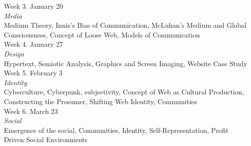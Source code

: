 \documentclass[10pt]{article}
\begin{document}
Week 3. January 20 \\
\textit{Media} \\
Medium Theory, Innis’s Bias of Communication, McLuhan’s Medium and Global Consciousness, Concept of Loose Web, Models of Communication \\

Week 4. January 27 \\
\textit{Design} \\
Hypertext, Semiotic Analysis, Graphics and Screen Imaging, Website Case Study \\

Week 5. February 3 \\
\textit{Identity} \\
Cyberculture, Cyberpunk,  subjectivity, Concept of Web as Cultural Production, Constructing the Prosumer, Shifting Web Identity, Communities \\

Week 6. March 23 \\
\textit{Social} \\
Emergence of the social, Communities, Identity, Self-Representation, Profit Driven Social Environments \\
\end{document}
